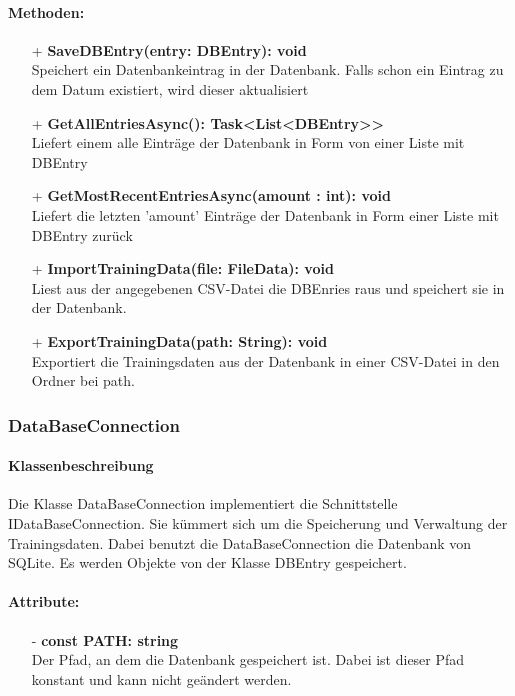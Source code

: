 \documentclass[a4paper,12pt]{article}
\begin{document}
	\paragraph{Methoden:}
	\begin{itemize}
		\item[+] \textbf{SaveDBEntry(entry: DBEntry): void}\\Speichert ein Datenbankeintrag in der \gls{Datenbank}. Falls schon ein Eintrag zu dem Datum existiert, wird dieser aktualisiert\\
		\item[+] \textbf{GetAllEntriesAsync(): Task<List<DBEntry>>}\\Liefert einem alle Einträge der Datenbank in Form von einer Liste mit DBEntry \\ 
		\item[+] \textbf{GetMostRecentEntriesAsync(amount : int): void}\\Liefert  die letzten 'amount' Einträge der Datenbank in Form einer Liste mit DBEntry zurück\\
		\item[+] \textbf{ImportTrainingData(file: FileData): void}\\Liest aus der angegebenen \gls{CSV}-Datei die DBEnries raus und speichert sie in der \gls{Datenbank}.\\
		\item[+] \textbf{ExportTrainingData(path: String): void}\\Exportiert die Trainingsdaten aus der \gls{Datenbank} in einer \gls{CSV}-Datei in den Ordner bei path. \\
	\end{itemize}

\subsubsection{DataBaseConnection}
	\paragraph{Klassenbeschreibung}
	Die Klasse DataBaseConnection implementiert die Schnittstelle IDataBaseConnection. Sie kümmert sich um die Speicherung und Verwaltung der Trainingsdaten. Dabei benutzt die DataBaseConnection die \gls{Datenbank} von SQLite. Es werden Objekte von der Klasse DBEntry gespeichert. 
	
	\paragraph{Attribute:}
	\begin{itemize}
		\item[-] \textbf{const PATH: string}\\Der Pfad, an dem die Datenbank gespeichert ist. Dabei ist dieser Pfad konstant und kann nicht geändert werden.
	\end{itemize}
\end{document}
